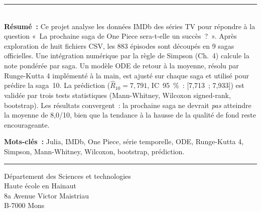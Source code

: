 \documentclass[a4paper,12pt,french]{article}
\begin{document}
\newpage
\thispagestyle{empty}
\vspace*{\fill}
\noindent\rule[2pt]{\textwidth}{0.5pt}\\[4pt]
{\textbf{Résumé~:}}
Ce projet analyse les données IMDb des séries TV pour répondre à la question
«~La prochaine saga de One Piece sera-t-elle un succès~?~». Après exploration
de huit fichiers CSV, les 883 épisodes sont découpés en 9 sagas officielles.
Une intégration numérique par la règle de Simpson (Ch.~4) calcule la note pondérée par saga.
Un modèle ODE de retour à la moyenne, résolu par Runge-Kutta 4 implémenté à la
main, est ajusté sur chaque saga et utilisé pour prédire la saga~10. La prédiction
($\hat{R}_{10} = 7{,}791$, IC~95~\%~: [7{,}713~; 7{,}933]) est validée par trois
tests statistiques (Mann-Whitney, Wilcoxon signed-rank, bootstrap). Les résultats
convergent~: la prochaine saga ne devrait \textit{pas} atteindre la moyenne de
8{,}0/10, bien que la tendance à la hausse de la qualité de fond reste encourageante.

\medskip
{\noindent\textbf{Mots-clés~:}} Julia, IMDb, One Piece, série temporelle, ODE,
Runge-Kutta 4, Simpson, Mann-Whitney, Wilcoxon, bootstrap, prédiction.
\\[4pt]
\noindent\rule[2pt]{\textwidth}{0.5pt}
\begin{center}
  Département des Sciences et technologies\\
  Haute école en Hainaut\\
  8a Avenue Victor Maistriau\\
  B-7000 Mons
\end{center}
\vspace*{\fill}
\end{document}
